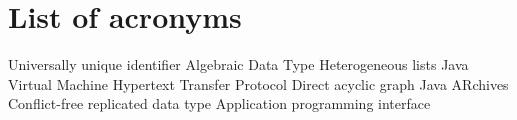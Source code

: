\chapter{List of acronyms}

{\small
\begin{acronym}[XXXXXXXX]
       {Universally unique identifier}
        {Algebraic Data Type}
      {Heterogeneous lists}
        {Java Virtual Machine}
       {Hypertext Transfer Protocol}
        {Direct acyclic graph}
        {Java ARchives}
       {Conflict-free replicated data type}
        {Application programming interface}
\end{acronym}
}

